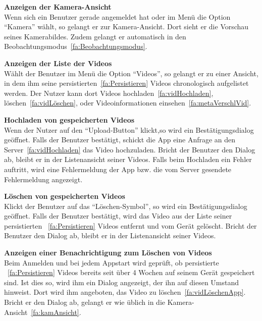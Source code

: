 \begin{enumerate}
\begin{minipage}[t]{\linewidth}
\item \label{fa:kamAnsicht}\textbf{Anzeigen der Kamera-Ansicht} \hfill \\
Wenn sich ein Benutzer gerade angemeldet hat oder im Menü die Option ``Kamera'' wählt, so gelangt er zur Kamera-Ansicht. Dort sieht er die Vorschau seines Kamerabildes. Zudem gelangt er automatisch in den Beobachtungsmodus~\eqref{fa:Beobachtungsmodus}.

\item \label{fa:vidAnsicht}\textbf{Anzeigen der Liste der  Videos} \hfill \\
Wählt der Benutzer im Menü die Option ``Videos'', so gelangt er zu einer Ansicht, in dem ihm seine persistierten~\eqref{fa:Persistieren} Videos chronologisch aufgelistet werden. Der Nutzer kann dort Videos hochladen~\eqref{fa:vidHochladen}, löschen~\eqref{fa:vidLöschen}, oder Videoinformationen einsehen~\eqref{fa:metaVerschlVid}.
\end{minipage}

\item \label{fa:vidHochladen}\textbf{Hochladen von gespeicherten Videos} \hfill \\
Wenn der Nutzer auf den ``Upload-Button'' klickt,so wird ein Bestätigungsdialog geöffnet. Falls der Benutzer bestätigt, schickt die \gls{App} eine Anfrage an den Server~\eqref{fa:vidHochladen} das Video hochzuladen. Bricht der Benutzer den Dialog ab, bleibt er in der Listenansicht seiner Videos. Falls beim Hochladen ein Fehler auftritt, wird eine Fehlermeldung der App bzw. die vom Server gesendete Fehlermeldung angezeigt.

\item \label{fa:vidLöschenApp}\textbf{Löschen von gespeicherten Videos} \hfill \\
Klickt der Benutzer auf das ``Löschen-Symbol'', so wird ein Bestätigungsdialog geöffnet. Falls der Benutzer bestätigt, wird das Video aus der Liste seiner persistierten ~\eqref{fa:Persistieren} Videos entfernt und vom Gerät gelöscht. Bricht der Benutzer den Dialog ab, bleibt er in der Listenansicht seiner Videos.

\item \label{fa:vidLöschenDialog}\textbf{Anzeigen einer Benachrichtigung zum Löschen von Videos} \hfill \\
Beim Anmelden und bei jedem Appstart wird geprüft, ob persistierte ~\eqref{fa:Persistieren} Videos bereits seit über 4 Wochen auf seinem Gerät gespeichert sind. Ist dies so, wird ihm ein Dialog angezeigt, der ihn auf diesen Umstand hinweist. Dort wird ihm angeboten, das Video zu löschen~\eqref{fa:vidLöschenApp}. Bricht er den Dialog ab, gelangt er wie üblich in die Kamera-Ansicht~\eqref{fa:kamAnsicht}.


\end{enumerate}
